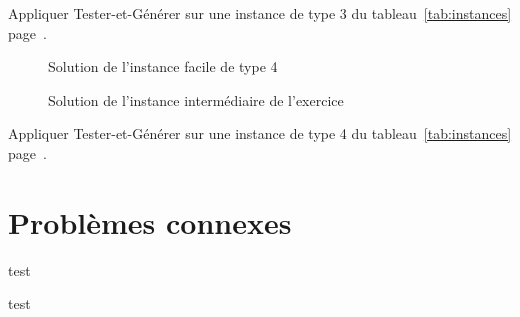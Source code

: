 \documentclass[11pt]{article}
\newcommand{\instance}[1]{instance de type #1 du tableau~\ref{tab:instances} page~\pageref{tab:instances}}
\renewenvironment{tikzpicture}[1][]{
  \comment%
}{%
  \endcomment%
}
\begin{document}
  \begin{exercice}{}
    Appliquer Tester-et-Générer sur une \instance{3}.
  \end{exercice}

\begin{figure}[htbp]
  \centering
  \resizebox{0.6\linewidth}{!}{
    
  }
  \caption{Solution de l'instance facile de type 4}
  \end{figure}

  \begin{figure}[htbp]
    \centering
    \caption{Solution de l'instance intermédiaire de l'exercice}
  \end{figure}

  \begin{exercice}{}
    Appliquer Tester-et-Générer sur une \instance{4}.
  \end{exercice}


  \section{Problèmes connexes}













  \begin{algorithme}{}
    test
  \end{algorithme}


  \begin{plusloin}{}
    test
  \end{plusloin}

  
  
\end{document}

